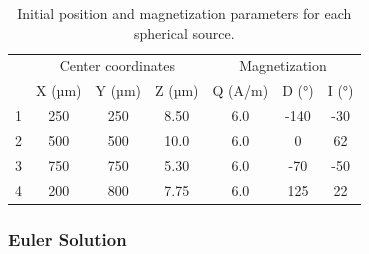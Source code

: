 \documentclass[manuscript,revised]{geophysics}
\begin{document}

\begin{table}[htbp]
\caption{Initial position and magnetization parameters for each spherical source.}
\label{tab:directmodel}
\centering
\begin{tabular}[width=1.0\textwidth]{ccccccc}
\rowcolor[HTML]{E7E7E7} 
\cellcolor[HTML]{E7E7E7}                         & \multicolumn{3}{c}{\cellcolor[HTML]{E7E7E7}Center coordinates} & \multicolumn{3}{c}{\cellcolor[HTML]{E7E7E7}Magnetization} \\
\rowcolor[HTML]{E7E7E7} 
\multirow{-2}{*}{\cellcolor[HTML]{E7E7E7}Sphere} & X (µm)              & Y (µm)             & Z (µm)             & Q (A/m)            & D (°)            & I (°)            \\
1                                                & 250                 & 250                & 8.50               & 6.0                & -140             & -30              \\
\rowcolor[HTML]{E7E7E7} 
2                                                & 500                 & 500                & 10.0               & 6.0                & 0                & 62               \\
3                                                & 750                 & 750                & 5.30               & 6.0                & -70              & -50              \\
\rowcolor[HTML]{E7E7E7} 
4                                                & 200                 & 800                & 7.75               & 6.0                & 125              & 22              
\end{tabular}
\end{table}



\subsubsection{Euler Solution}

\end{document}
